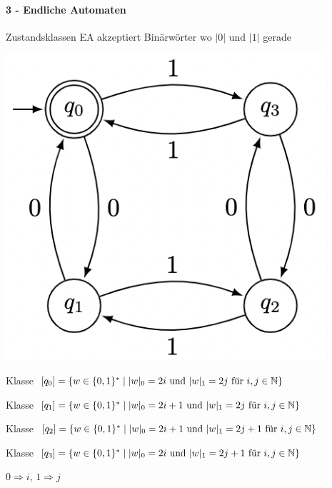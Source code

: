 \paragraph*{3 - Endliche Automaten}


\begin{example2}{Zustandsklassen} {\small EA akzeptiert Binärwörter wo $|0|$ und $|1|$ gerade}

    \begin{minipage}
        {0.3\linewidth}
        \includegraphics[width=1\linewidth]{images/zustandbsp.png}
    \end{minipage}
    \begin{minipage}{0.7\linewidth}
        
        Klasse $[q_0] = \{w \in \{0,1\}^* \mid |w|_0 = 2i \text{ und } |w|_1 = 2j \text{ für } i,j \in \mathbb{N}\}$

        Klasse $[q_1] = \{w \in \{0,1\}^* \mid |w|_0 = 2i+1 \text{ und } |w|_1 = 2j \text{ für } i,j \in \mathbb{N}\}$

        Klasse $[q_2] = \{w \in \{0,1\}^* \mid |w|_0 = 2i+1 \text{ und } |w|_1 = 2j+1 \text{ für } i,j \in \mathbb{N}\}$

        Klasse $[q_3] = \{w \in \{0,1\}^* \mid |w|_0 = 2i \text{ und } |w|_1 = 2j+1 \text{ für } i,j \in \mathbb{N}\}$
        
    \end{minipage}

    {\small $0 \Rightarrow i$, $1 \Rightarrow j$}
\end{example2}

